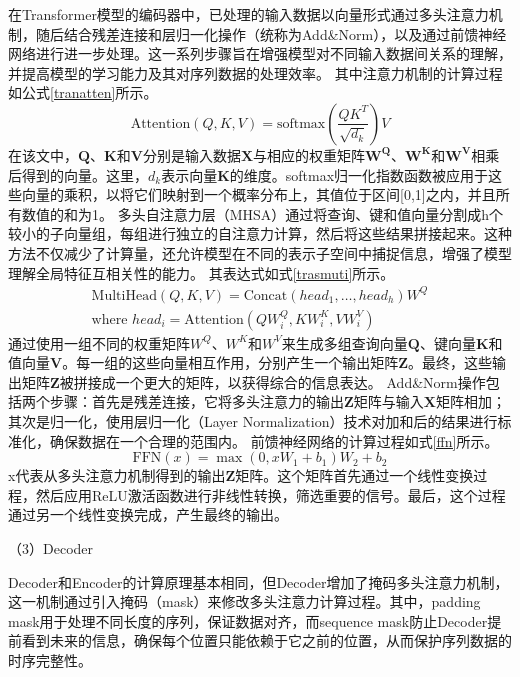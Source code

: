 在Transformer模型的编码器中，已处理的输入数据以向量形式通过多头注意力机制，随后结合残差连接和层归一化操作（统称为Add\&Norm），以及通过前馈神经网络进行进一步处理。这一系列步骤旨在增强模型对不同输入数据间关系的理解，并提高模型的学习能力及其对序列数据的处理效率。
其中注意力机制的计算过程如公式\eqref{tranatten}所示。
\begin{equation}
    \text{Attention}(Q,K,V) = \text{softmax}\left(\frac{QK^T}{\sqrt{d_k}}\right)V
    \label{tranatten}
\end{equation}
在该文中，\(\mathbf{Q}\)、\(\mathbf{K}\)和\(\mathbf{V}\)分别是输入数据\(\mathbf{X}\)与相应的权重矩阵\(\mathbf{W^Q}\)、\(\mathbf{W^K}\)和\(\mathbf{W^V}\)相乘后得到的向量。这里，\(d_k\)表示向量\(\mathbf{K}\)的维度。softmax归一化指数函数被应用于这些向量的乘积，以将它们映射到一个概率分布上，其值位于区间[0,1]之内，并且所有数值的和为1。
多头自注意力层（MHSA）通过将查询、键和值向量分割成h个较小的子向量组，每组进行独立的自注意力计算，然后将这些结果拼接起来。这种方法不仅减少了计算量，还允许模型在不同的表示子空间中捕捉信息，增强了模型理解全局特征互相关性的能力。
其表达式如式\eqref{trasmuti}所示。
\begin{equation}
    \begin{aligned}
        \text{MultiHead}(Q, K, V) = \text{Concat}(head_1, \ldots, head_h)W^Q \\
        \text{where } head_i = \text{Attention}(QW_i^Q, KW_i^K, VW_i^V)
        \label{trasmuti}
    \end{aligned}
\end{equation}
通过使用一组不同的权重矩阵\(W^Q\)、\(W^K\)和\(W^V\)来生成多组查询向量\(\mathbf{Q}\)、键向量\(\mathbf{K}\)和值向量\(\mathbf{V}\)。每一组的这些向量相互作用，分别产生一个输出矩阵\(\mathbf{Z}\)。最终，这些输出矩阵\(\mathbf{Z}\)被拼接成一个更大的矩阵，以获得综合的信息表达。   
Add\&Norm操作包括两个步骤：首先是残差连接，它将多头注意力的输出\(\mathbf{Z}\)矩阵与输入\(\mathbf{X}\)矩阵相加；其次是归一化，使用层归一化（Layer Normalization）技术对加和后的结果进行标准化，确保数据在一个合理的范围内。
前馈神经网络的计算过程如式\eqref{ffn}所示。
\begin{equation}
    \text{FFN}(x) = \max(0, xW_1 + b_1)W_2 + b_2
    \label{ffn}
\end{equation}
x代表从多头注意力机制得到的输出\(\mathbf{Z}\)矩阵。这个矩阵首先通过一个线性变换过程，然后应用ReLU激活函数进行非线性转换，筛选重要的信号。最后，这个过程通过另一个线性变换完成，产生最终的输出。

（3）Decoder 

Decoder和Encoder的计算原理基本相同，但Decoder增加了掩码多头注意力机制，这一机制通过引入掩码（mask）来修改多头注意力计算过程。其中，padding mask用于处理不同长度的序列，保证数据对齐，而sequence mask防止Decoder提前看到未来的信息，确保每个位置只能依赖于它之前的位置，从而保护序列数据的时序完整性。

